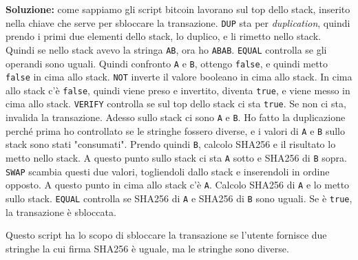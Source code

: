 \textbf{Soluzione:} come sappiamo gli script bitcoin lavorano sul top dello stack, inserito nella chiave che serve per sbloccare la transazione. \texttt{DUP} sta per \textit{duplication}, quindi prendo i primi due elementi dello stack, lo duplico, e li rimetto nello stack. Quindi se nello stack avevo la stringa \texttt{AB}, ora ho \texttt{ABAB}. \texttt{EQUAL} controlla se gli operandi sono uguali. Quindi confronto \texttt{A} e \texttt{B}, ottengo \texttt{false}, e quindi metto \texttt{false} in cima allo stack. \texttt{NOT} inverte il valore booleano in cima allo stack. In cima allo stack c'è \texttt{false}, quindi viene preso e invertito, diventa \texttt{true}, e viene messo in cima allo stack. \texttt{VERIFY} controlla se sul top dello stack ci sta \texttt{true}. Se non ci sta, invalida la transazione. Adesso sullo stack ci sono \texttt{A} e \texttt{B}. Ho fatto la duplicazione perché prima ho controllato se le stringhe fossero diverse, e i valori di \texttt{A} e \texttt{B} sullo stack sono stati "consumati". Prendo quindi \texttt{B}, calcolo SHA256 e il risultato lo metto nello stack. A questo punto sullo stack ci sta \texttt{A} sotto e SHA256 di \texttt{B} sopra. \texttt{SWAP} scambia questi due valori, togliendoli dallo stack e inserendoli in ordine opposto. A questo punto in cima allo stack c'è \texttt{A}. Calcolo SHA256 di \texttt{A} e lo metto sullo stack. \texttt{EQUAL} controlla se SHA256 di \texttt{A} e SHA256 di \texttt{B} sono uguali. Se è \texttt{true}, la transazione è sbloccata.

Questo script ha lo scopo di sbloccare la transazione se l'utente fornisce due stringhe la cui firma SHA256 è uguale, ma le stringhe sono diverse. 

